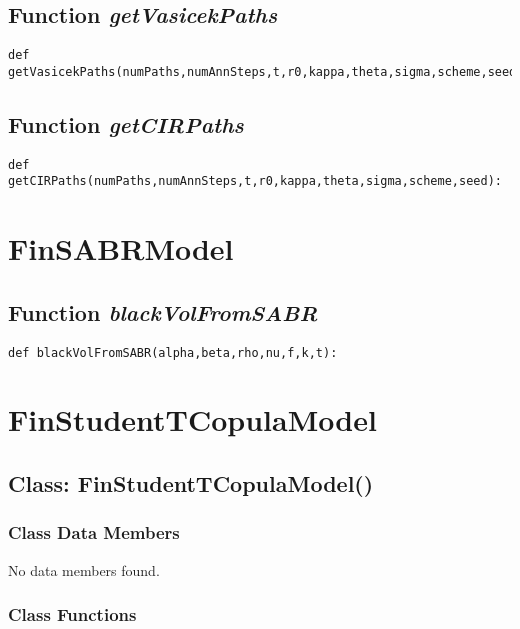 \documentclass[twoside,11pt]{book}
\begin{document}
\subsection{Function {\it getVasicekPaths}}


\begin{lstlisting}
def getVasicekPaths(numPaths,numAnnSteps,t,r0,kappa,theta,sigma,scheme,seed):
\end{lstlisting}

\subsection{Function {\it getCIRPaths}}


\begin{lstlisting}
def getCIRPaths(numPaths,numAnnSteps,t,r0,kappa,theta,sigma,scheme,seed):
\end{lstlisting}

\newpage
\section{FinSABRModel}

\subsection{Function {\it blackVolFromSABR}}


\begin{lstlisting}
def blackVolFromSABR(alpha,beta,rho,nu,f,k,t): 
\end{lstlisting}

\newpage
\section{FinStudentTCopulaModel}

\subsection{Class: FinStudentTCopulaModel()}


\subsubsection{Class Data Members}
No data members found.

\subsubsection{Class Functions}
\end{document}
